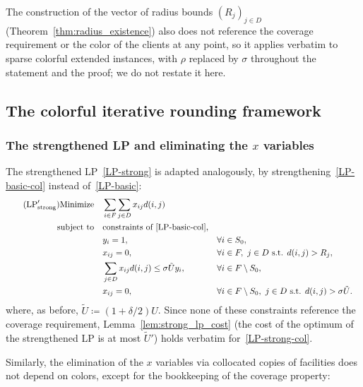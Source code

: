 The construction of the vector of radius bounds $(R_j)_{j \in D}$ (Theorem~\ref{thm:radius_existence}) also does not reference the coverage requirement or the color of the clients at any point, so it applies verbatim to sparse colorful extended instances, with $\rho$ replaced by $\sigma$ throughout the statement and the proof; we do not restate it here.

\subsection{The colorful iterative rounding framework}

\subsubsection{The strengthened LP and eliminating the $x$ variables}

The strengthened LP~\eqref{LP-strong} is adapted analogously, by strengthening~\eqref{LP-basic-col} instead of~\eqref{LP-basic}:
\begin{align} \tag{$\text{LP}_{\text{strong}}'$} \label{LP-strong-col}
\text{Minimize} \quad &\sum_{i \in F} \sum_{j \in D} x_{ij} d(i,j) \\
\text{subject to} \quad &\text{constraints of } \eqref{LP-basic-col}, \nonumber \\
& y_i = 1, \quad &&\forall i \in S_0, \nonumber \\
& x_{ij} = 0, \quad &&\forall i \in F, \ j \in D \text{ s.t. } d(i,j) > R_j, \nonumber \\
& \sum_{j \in D} x_{ij} d(i,j) \leq \sigma \tilde{U} y_i, \quad &&\forall i \in F \setminus S_0, \nonumber \\
& x_{ij} = 0, \quad &&\forall i \in F \setminus S_0, \ j \in D \text{ s.t. } d(i,j) > \sigma \tilde{U}. \nonumber
\end{align}
where, as before, $\tilde{U} \coloneqq (1+\delta/2)U$. Since none of these constraints reference the coverage requirement, Lemma~\ref{lem:strong_lp_cost} (the cost of the optimum of the strengthened LP is at most $\tilde{U}'$) holds verbatim for~\eqref{LP-strong-col}.

Similarly, the elimination of the $x$ variables via collocated copies of facilities does not depend on colors, except for the bookkeeping of the coverage property:

